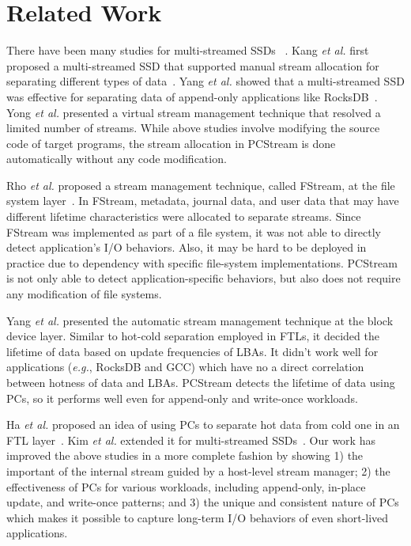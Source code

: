\section{Related Work}
There have been many studies for multi-streamed SSDs ~\cite{MultiStream, Level,
vStream, FStream, AutoStream, PCStream}.  Kang {\it et al.} first proposed a
multi-streamed SSD that supported manual stream allocation for separating
different types of data~\cite{MultiStream}.  Yang {\it et al.} showed that a
multi-streamed SSD was effective for separating data of append-only
applications like RocksDB~\cite{Level}.  Yong {\it et al.} presented a virtual
stream management technique that resolved a limited number of streams.  While
above studies involve modifying the source code of target programs, the
stream allocation in PCStream is done automatically without any code
modification.

Rho {\it et al.} proposed a stream management technique, called FStream, at the
file system layer~\cite{FStream}. In FStream, metadata, journal
data, and user data that may have different lifetime characteristics were
allocated to separate streams.  Since FStream was implemented as part of a file
system, it was not able to directly detect application's I/O behaviors.
Also, it may be hard to be deployed in practice due to 
dependency with specific file-system implementations. PCStream is not
only able to detect application-specific behaviors, but also does not require
any modification of file systems.

Yang {\it et al.} presented the automatic stream management technique at the
block device layer. Similar to hot-cold separation employed in FTLs,
it decided the lifetime of data based on update frequencies of LBAs.
It didn't work well for applications ({\it e.g.}, RocksDB
and GCC) which have no a direct correlation between hotness of data
and LBAs.  PCStream detects the lifetime of data using PCs, so it
performs well even for append-only and write-once workloads.

Ha {\it et al.} proposed an idea of using PCs to separate hot data from cold
one in an FTL layer~\cite{PCHa}.  Kim {\it et al.} extended it for
multi-streamed SSDs~\cite{PCStream}.  Our work has improved the above
studies in a more complete fashion by showing 1) the important of the
internal stream guided by a host-level stream manager; 2) the effectiveness of
PCs for various workloads, including append-only, in-place update, and
write-once patterns; and 3) the unique and consistent nature of PCs which makes
it possible to capture long-term I/O behaviors of even short-lived
applications.


